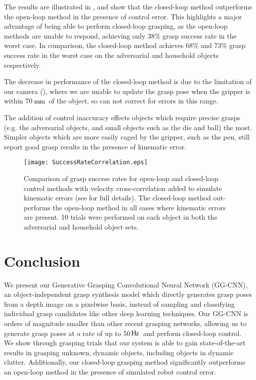 \documentclass[conference]{IEEEtran}
\newcommand{\pack}	{\hspace{-0.08em}}
\newcommand{\Hz}	{\ensuremath{\rm\,H\pack z}}
\newcommand{\mm}	{\ensuremath{\rm\,m\pack m}}
\begin{document}
The results are illustrated in , and show that the closed-loop method outperforms the open-loop method in the presence of control error.  This highlights a major advantage of being able to perform closed-loop grasping, as the open-loop methods are unable to respond, achieving only 38\% grasp success rate in the worst case.  In comparison, the closed-loop method achieves 68\% and 73\% grasp success rate in the worst case on the adversarial and household objects respectively.

The decrease in performance of the closed-loop method is due to the limitation of our camera (), where we are unable to update the grasp pose when the gripper is within 70\mm~of the object, so can not correct for errors in this range.

The addition of control inaccuracy effects objects which require precise grasps (e.g. the adversarial objects, and small objects such as the die and ball) the most.  Simpler objects which are more easily caged by the gripper, such as the pen, still report good grasp results in the presence of kinematic error.

\begin{figure}[tpb]
    \centering
    \texttt{[image: SuccessRateCorrelation.eps]}
    \vspace{-8mm}
    \caption{Comparison of grasp success rates for open-loop and closed-loop control methods with velocity cross-correlation added to simulate kinematic errors (see  for full details).  The closed-loop method out-performs the open-loop method in all cases where kinematic errors are present.  10 trials were performed on each object in both the adversarial and household object sets.
    }
  \label{fig:kinematicerror} 
  \vspace{-6mm}
\end{figure}


\section{Conclusion} 
\label{sec:conclusion}

We present our Generative Grasping Convolutional Neural Network (GG-CNN), an object-independent grasp synthesis model which directly generates grasp poses from a depth image on a pixelwise basis, instead of sampling and classifying individual grasp candidates like other deep learning techniques.  Our GG-CNN is orders of magnitude smaller than other recent grasping networks, allowing us to generate grasp poses at a rate of up to 50\Hz~and perform closed-loop control.  
We show through grasping trials that our system is able to gain state-of-the-art results in grasping unknown, dynamic objects, including objects in dynamic clutter.  
Additionally, our closed-loop grasping method significantly outperforms an open-loop method in the presence of simulated robot control error.
\end{document}
